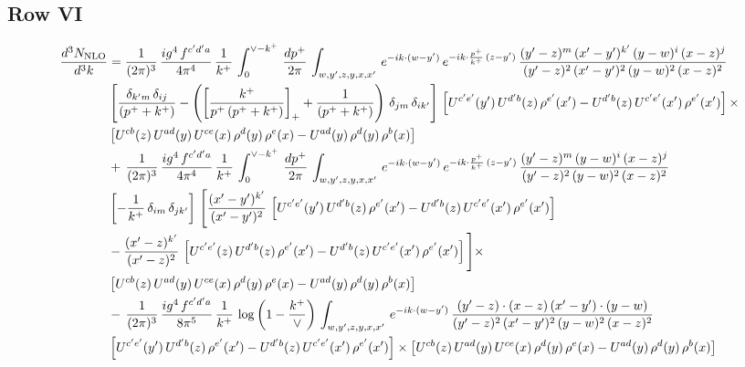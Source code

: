 \documentclass[9pt]{article}
\numberwithin{equation}{section}
\begin{document}
\subsection{Row VI}
\begin{align}
    \frac{d^{3}N_{\rm NLO}}{d^{3}k} & =  \frac{1}{(2\pi)^{3}}\, \frac{ig^{4}\,f^{c'd'a}}{4\pi^{4}}\, \frac{1}{k^{+}}\,\int_{0}^{\vee-k^{+}}\, \frac{dp^{+}}{2\pi}\, \int_{w,y',z,y,x,x'}\, e^{-ik\cdot (w-y')}\, e^{-ik\cdot \frac{p^{+}}{k^{+}}\,(z-y')}\,\frac{(y'-z)^{m}\,(x'-y')^{k'}\,(y-w)^{i}\,(x-z)^{j}}{(y'-z)^{2}\,(x'-y')^{2}\,(y-w)^{2}\,(x-z)^{2}}\notag \\ & \left[\frac{\delta_{k'm}\,\delta_{ij}}{(p^{+}+k^{+})}-\left(\left[\frac{k^{+}}{p^{+}\,(p^{+}+k^{+})}\right]_{+}+\frac{1}{(p^{+}+k^{+})}\right)\,\delta_{jm}\,\delta_{ik'}\right]\, \left[U^{c'e'}(y')\,U^{d'b}(z)\,\rho^{e'}(x')-U^{d'b}(z)\,U^{c'e'}(x')\,\rho^{e'}(x')\right]\times\notag \\ &  \left[U^{cb}(z)\,U^{ad}(y)\,U^{ce}(x)\,\rho^{d}(y)\,\rho^{e}(x)-U^{ad}(y)\,\rho^{d}(y)\,\rho^{b}(x)\right] \notag \\ &  +\,\frac{1}{(2\pi)^{3}}\, \frac{ig^{4}\,f^{c'd'a}}{4\pi^{4}}\, \frac{1}{k^{+}}\,\int_{0}^{\vee-k^{+}}\, \frac{dp^{+}}{2\pi}\, \int_{w,y',z,y,x,x'}\, e^{-ik\cdot (w-y')}\, e^{-ik\cdot \frac{p^{+}}{k^{+}}\,(z-y')}\,\frac{(y'-z)^{m}\,(y-w)^{i}\,(x-z)^{j}}{(y'-z)^{2}\,(y-w)^{2}\,(x-z)^{2}}\notag \\ &  \left[-\frac{1}{k^{+}}\, \delta_{im}\, \delta_{jk'}\right]\, \Bigg[\frac{(x'-y')^{k'}}{(x'-y')^{2}}\,\left[U^{c'e'}(y')\,U^{d'b}(z)\,\rho^{e'}(x')-U^{d'b}(z)\,U^{c'e'}(x')\,\rho^{e'}(x')\right]\notag \\ & -\frac{(x'-z)^{k'}}{(x'-z)^{2}}\,\left[U^{c'e'}(z)\,U^{d'b}(z)\,\rho^{e'}(x')-U^{d'b}(z)\,U^{c'e'}(x')\,\rho^{e'}(x')\right]\Bigg]\times\notag \\ &    \left[U^{cb}(z)\,U^{ad}(y)\,U^{ce}(x)\,\rho^{d}(y)\,\rho^{e}(x)-U^{ad}(y)\,\rho^{d}(y)\,\rho^{b}(x)\right] \notag \\
&  -\,\frac{1}{(2\pi)^{3}}\, \frac{ig^{4}\,f^{c'd'a}}{8\pi^{5}}\, \frac{1}{k^{+}}\,\log{\left(1-\frac{k^{+}}{\vee}\right)}\, \int_{w,y',z,y,x,x'}\, e^{-ik\cdot (w-y')}\,\frac{(y'-z)\cdot (x-z)\,(x'-y')\cdot (y-w)}{(y'-z)^{2}\,(x'-y')^{2}\,(y-w)^{2}\,(x-z)^{2}}\notag \\ & \left[U^{c'e'}(y')\,U^{d'b}(z)\,\rho^{e'}(x')-U^{d'b}(z)\,U^{c'e'}(x')\,\rho^{e'}(x')\right]\times  \left[U^{cb}(z)\,U^{ad}(y)\,U^{ce}(x)\,\rho^{d}(y)\,\rho^{e}(x)-U^{ad}(y)\,\rho^{d}(y)\,\rho^{b}(x)\right]
\end{align}
\end{document}
